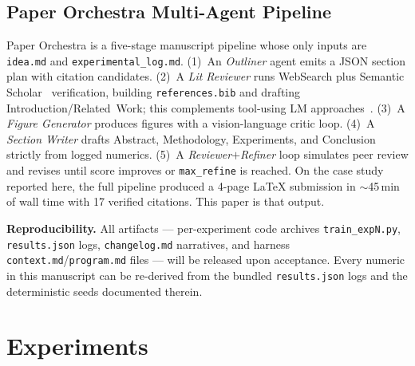 \documentclass{article}
\begin{document}
\subsection{Paper Orchestra Multi-Agent Pipeline}
\label{sec:orchestra}
Paper Orchestra is a five-stage manuscript pipeline whose only inputs are \texttt{idea.md} and \texttt{experimental\_log.md}. (1)~An \emph{Outliner} agent emits a JSON section plan with citation candidates. (2)~A \emph{Lit Reviewer} runs WebSearch plus Semantic Scholar~\cite{Kinney2023Semantic} verification, building \texttt{references.bib} and drafting Introduction/Related~Work; this complements tool-using LM approaches~\cite{Schick2023Toolformer}. (3)~A \emph{Figure Generator} produces figures with a vision-language critic loop. (4)~A \emph{Section Writer} drafts Abstract, Methodology, Experiments, and Conclusion strictly from logged numerics. (5)~A \emph{Reviewer$+$Refiner} loop simulates peer review and revises until score improves or \texttt{max\_refine} is reached. On the case study reported here, the full pipeline produced a 4-page LaTeX submission in $\sim$45\,min of wall time with 17 verified citations. This paper is that output.

\textbf{Reproducibility.} All artifacts --- per-experiment code archives \texttt{train\_expN.py}, \texttt{results.json} logs, \texttt{changelog.md} narratives, and harness \texttt{context.md}/\texttt{program.md} files --- will be released upon acceptance. Every numeric in this manuscript can be re-derived from the bundled \texttt{results.json} logs and the deterministic seeds documented therein.

\section{Experiments}
\label{sec:exp}
\end{document}

